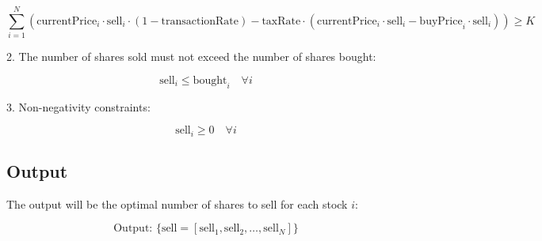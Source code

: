 \documentclass{article}
\begin{document}
\[
\sum_{i=1}^{N} \left( \text{currentPrice}_i \cdot \text{sell}_i \cdot (1 - \text{transactionRate}) - \text{taxRate} \cdot \left( \text{currentPrice}_i \cdot \text{sell}_i - \text{buyPrice}_i \cdot \text{sell}_i \right) \right) \geq K
\]

2. The number of shares sold must not exceed the number of shares bought:

\[
\text{sell}_i \leq \text{bought}_i \quad \forall i
\]

3. Non-negativity constraints:

\[
\text{sell}_i \geq 0 \quad \forall i
\]

\subsection*{Output}
The output will be the optimal number of shares to sell for each stock \( i \):

\[
\text{Output: } \{\text{sell} = [\text{sell}_1, \text{sell}_2, \ldots, \text{sell}_N]\}
\]
\end{document}
